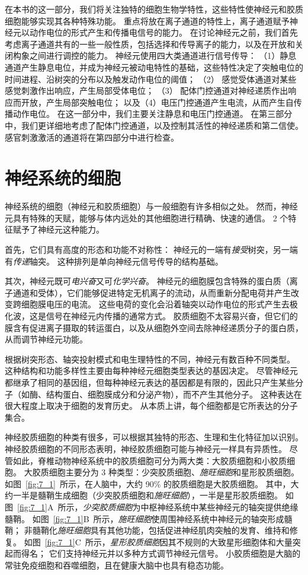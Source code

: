 在本书的这一部分，我们将关注独特的细胞生物学特性，这些特性使神经元和胶质细胞能够实现其各种特殊功能。
重点将放在离子通道的特性上，离子通道赋予神经元以动作电位的形式产生和传播电信号的能力。
在讨论神经元之前，我们首先考虑离子通道共有的一些一般性质，包括选择和传导离子的能力，以及在开放和关闭构象之间进行调控的能力。
神经元使用四大类通道进行信号传导：
（1）静息通道产生静息电位，并成为神经元被动电特性的基础，这些特性决定了突触电位的时间进程、沿树突的分布以及触发动作电位的阈值；
（2） 感觉受体通道对某些感觉刺激作出响应，产生局部受体电位；
（3） 配体门控通道对神经递质作出响应而开放，产生局部突触电位；
以及（4）电压门控通道产生电流，从而产生自传播动作电位。
在这一部分中，我们主要关注静息和电压门控通道。
在第三部分中，我们更详细地考虑了配体门控通道，以及控制其活性的神经递质和第二信使。
感官刺激激活的通道将在第四部分中进行检查。




\chapter{神经系统的细胞} \label{chap:chap7}

神经系统的细胞（神经元和胶质细胞）与一般细胞有许多相似之处。
然而，神经元具有特殊的天赋，能够与体内远处的其他细胞进行精确、快速的通信。
2 个特征赋予了神经元这种能力。


首先，它们具有高度的形态和功能不对称性：
神经元的一端有\textit{接受}树突，另一端有\textit{传递}轴突。
这种排列是单向神经元信号传导的结构基础。


其次，神经元既可\textit{电兴奋}又可\textit{化学兴奋}。
神经元的细胞膜包含特殊的蛋白质（离子通道和受体），它们能够促进特定无机离子的流动，从而重新分配电荷并产生改变跨细胞膜电压的电流。
这些电荷的变化会沿着轴突以动作电位的形式产生去极化波，这是信号在神经元内传播的通常方式。
胶质细胞不太容易兴奋，但它们的膜含有促进离子摄取的转运蛋白，以及从细胞外空间去除神经递质分子的蛋白质，从而调节神经元功能。


根据树突形态、轴突投射模式和电生理特性的不同，神经元有数百种不同类型。
这种结构和功能多样性主要由每种神经元细胞类型表达的基因决定。
尽管神经元都继承了相同的基因组，但每种神经元表达的基因都是有限的，因此只产生某些分子（如酶、结构蛋白、细胞膜成分和分泌产物），而不产生其他分子。
这种表达在很大程度上取决于细胞的发育历史。
从本质上讲，每个细胞都是它所表达的分子集合。


神经胶质细胞的种类有很多，可以根据其独特的形态、生理和生化特征加以识别。
神经胶质细胞的不同形态表明，神经胶质细胞可能与神经元一样具有异质性。
尽管如此，脊椎动物神经系统中的胶质细胞可分为两大类：大胶质细胞和小胶质细胞。
大胶质细胞主要分为 3 种类型：少突胶质细胞、\textit{施旺细胞}和星形胶质细胞。
如图~\ref{fig:7_1}~所示，在人脑中，大约 90\% 的胶质细胞是大胶质细胞。
其中，大约一半是髓鞘生成细胞（少突胶质细胞和\textit{施旺细胞}），一半是星形胶质细胞。
如图~\ref{fig:7_1}A~所示，\textit{少突胶质细胞}为中枢神经系统中某些神经元的轴突提供绝缘髓鞘。
如图~\ref{fig:7_1}B~所示，\textit{施旺细胞}使周围神经系统中神经元的轴突形成髓鞘；
非髓鞘化\textit{施旺细胞}具有其他功能，包括促进神经肌肉突触的发育、维持和修复。
如图~\ref{fig:7_1}C~所示，\textit{星形胶质细胞}因其不规则的大致星形细胞体和大量突起而得名；
它们支持神经元并以多种方式调节神经元信号。 
小胶质细胞是大脑的常驻免疫细胞和吞噬细胞，且在健康大脑中也具有稳态功能。


